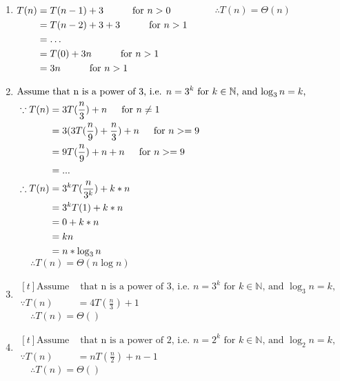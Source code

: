 \documentclass{article}
\begin{document}
\begin{enumerate}[label=(\alph*)]
\item $\begin{aligned}[t]
T(n) &= T(n - 1) + 3 \indent \indent \text{for}\ n > 0&\\
&= T(n - 2) + 3 + 3 \indent \indent \text{for}\ n > 1&\\
&= \dots &\\
&= T(0) + 3n \indent \indent \text{for}\ n > 1&\\
&= 3n \indent \indent \text{for}\ n > 1
\end{aligned}$
$\quad \ \ \therefore T(n) = \Theta(n)$

\item $\begin{aligned}[t]
\text{Assume} & \text{ that n is a power of 3, i.e. $n=3^k$ for $k \in \mathbb{N}$, and $\log_3 n = k$,}&\\
\because T(n) &= 3T(\frac{n}{3}) + n \indent \text{for $n\neq1$}&\\
&= 3(3T(\frac{n}{9}) + \frac{n}{3}) + n \indent \text{for $n>=9$}&\\
&= 9T(\frac{n}{9}) + n + n \indent \text{for $n>=9$}&\\
&= ...&\\
\therefore T(n) &= 3^kT(\frac{n}{3^k}) + k*n &\\
&= 3^kT(1) + k*n&\\
&= 0 + k*n&\\
&= kn&\\
&= n * \log_3 n
\end{aligned}$
$\quad \ \ \therefore T(n) = \Theta(n \log n)$

\item $\begin{aligned}[t]
\text{Assume} & \text{ that n is a power of 3, i.e. $n=3^k$ for $k \in \mathbb{N}$, and $\log_3 n = k$,}&\\
\because T(n) &= 4T(\frac{n}{3})+1
\end{aligned}$
$\quad \ \ \therefore T(n) = \Theta()$

\item $\begin{aligned}[t]
\text{Assume} & \text{ that n is a power of 2, i.e. $n=2^k$ for $k \in \mathbb{N}$, and $\log_2 n = k$,}&\\
\because T(n) &= nT(\frac{n}{2})+n-1
\end{aligned}$
$\quad \ \ \therefore T(n) = \Theta()$

\end{enumerate}
\end{document}
